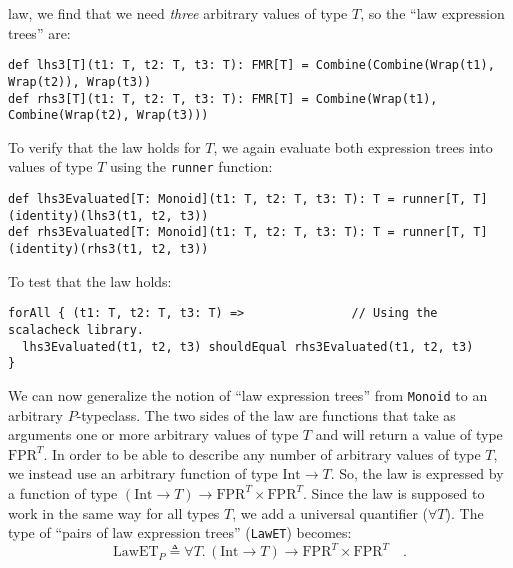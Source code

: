 law, we find that we need \emph{three} arbitrary values of type $T$,
so the \textsf{``}law expression trees\textsf{''} are:
\begin{lstlisting}
def lhs3[T](t1: T, t2: T, t3: T): FMR[T] = Combine(Combine(Wrap(t1), Wrap(t2)), Wrap(t3))
def rhs3[T](t1: T, t2: T, t3: T): FMR[T] = Combine(Wrap(t1), Combine(Wrap(t2), Wrap(t3)))
\end{lstlisting}
To verify that the law holds for $T$, we again evaluate both expression
trees into values of type $T$ using the \lstinline!runner!
function:
\begin{lstlisting}
def lhs3Evaluated[T: Monoid](t1: T, t2: T, t3: T): T = runner[T, T](identity)(lhs3(t1, t2, t3))
def rhs3Evaluated[T: Monoid](t1: T, t2: T, t3: T): T = runner[T, T](identity)(rhs3(t1, t2, t3))
\end{lstlisting}
To test that the law holds:
\begin{lstlisting}
forAll { (t1: T, t2: T, t3: T) =>               // Using the scalacheck library.
  lhs3Evaluated(t1, t2, t3) shouldEqual rhs3Evaluated(t1, t2, t3)
}
\end{lstlisting}
We can now generalize the notion of \textsf{``}law expression trees\textsf{''} from
\lstinline!Monoid! to an
arbitrary $P$-typeclass. The two sides of the law are functions that
take as arguments one or more arbitrary values of type $T$ and will
return a value of type $\text{FPR}^{T}$. In order to be able to describe
any number of arbitrary values of type $T$, we instead use an arbitrary
function of type $\text{Int}\rightarrow T$. So, the law is expressed
by a function of type $(\text{Int}\rightarrow T)\rightarrow\text{FPR}^{T}\times\text{FPR}^{T}$.
Since the law is supposed to work in the same way for all types $T$,
we add a universal quantifier ($\forall T$). The type of \textsf{``}pairs
of law expression trees\textsf{''} (\lstinline!LawET!)
becomes:
\begin{equation}
\text{LawET}_{P}\triangleq\forall T.\,(\text{Int}\rightarrow T)\rightarrow\text{FPR}^{T}\times\text{FPR}^{T}\quad.\label{eq:law-expression-tree-type}
\end{equation}

